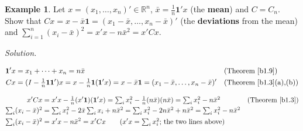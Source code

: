 \documentclass[12pt]{article}
\newcommand{\R}{\mathbb R}
\newcommand{\one}{\mathbf 1}
\theoremstyle{definition}
\newtheorem{example}[theorem]{Example}
\newcommand{\boardtop}{\vspace*{-\abovedisplayskip}}
\begin{document}
\begin{example}\label{b1.16}
Let \(x=(x_1,\dots,x_n)'\in\R^n\), \(\bar x=\frac1n\one'x\) (the \textbf{mean}) and \(C=C_n\). Show that
\(Cx=x-\bar x\one=(x_1-\bar x,\dots,x_n-\bar x)'\) (the \textbf{deviations} from the mean) and
\(\sum_{i=1}^n(x_i-\bar x)^2=x'x-n\bar x^2=x'Cx\).
\end{example}
\textit{Solution.}
\begin{board}[Deviations:]
\boardtop
\begin{align*}
\one'x&=x_1+\dots+x_n=n\bar x&&\text{(Theorem~\ref{b1.9})}\\
Cx&=(I-\tfrac1n\one\one')x=x-\tfrac1n\one(\one'x)=x-\bar x\one=(x_1-\bar x,\dots,x_n-\bar x)'&&\text{(Theorem~\ref{b1.3}(a),(b))}
\end{align*}
\end{board}
\begin{board}[Sum of squares; \(x'\one=\one'x=n\bar x\) (Theorem~\ref{b1.9}):]
\boardtop
\begin{align*}
x'Cx&=x'x-\tfrac1n(x'\one)(\one'x)=\textstyle\sum_ix_i^2-\tfrac1n(n\bar x)(n\bar x)=\sum_ix_i^2-n\bar x^2
&&\text{(Theorem~\ref{b1.3})}\\
\textstyle\sum_i(x_i-\bar x)^2&=\textstyle\sum_ix_i^2-2\bar x\sum_ix_i+n\bar x^2=\sum_ix_i^2-2n\bar x^2+n\bar x^2
=\sum_ix_i^2-n\bar x^2\\
\textstyle\sum_i(x_i-\bar x)^2&=x'x-n\bar x^2=x'Cx\qquad(x'x=\textstyle\sum_ix_i^2\text{; the two lines above})
\end{align*}
\end{board}
\end{document}

